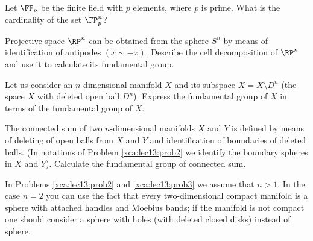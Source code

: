 \exercises
\begin{xca}
Let $\FF_{p}$ be the finite field with $p$ elements, where $p$ is
prime. What is the cardinality of the set $\FP^{n}_{p}$?
\end{xca}
\begin{xca}
Projective space $\RP^n$ can be obtained from the sphere $S^n$ by
means of identification of antipodes $( x \sim -x)$. Describe the
cell decomposition of $\RP^n$ and use it to calculate its
fundamental group. 
\end{xca}
\begin{xca}\label{xca:lec13:prob2}
Let us consider an $n$-dimensional manifold $X$ and its subspace
$X = X \setminus D^n$ (the space $X$ with deleted open ball
$D^n$). Express the fundamental group of $X$ in terms of the
fundamental group of $X$. 
\end{xca}
\begin{xca}\label{xca:lec13:prob3}
The connected sum of two $n$-dimensional manifolds $X$ and $Y$ is
defined by means of deleting of open balls from $X$ and $Y$ and
identification of boundaries of deleted balls. (In notations of
Problem \ref{xca:lec13:prob2} we identify the boundary spheres in
$X$ and $Y$). Calculate the fundamental group of connected sum. 
\end{xca}
\begin{rmk}
In Problems \ref{xca:lec13:prob2} and \ref{xca:lec13:prob3} we
assume that $n>1$. In the case $n=2$ you can use the fact that
every two-dimensional compact manifold is a sphere with attached
handles and Moebius bands; if the manifold is not compact one
should consider a sphere with holes (with deleted closed disks)
instead of sphere.
\end{rmk}
